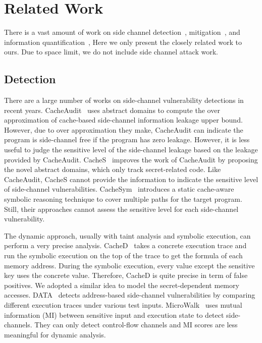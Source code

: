 \section{Related Work}

There is a vast amount of work on 
side channel 
detection~\cite{182946, 236338, Brotzman19Casym, 203878,217537,Wichelmann:2018:MFF:3274694.3274741,langley2010ctgrind}, 
mitigation~\cite{Page2005PartitionedCA,
Wang:2007:NCD:1250662.1250723,Zhang:2015:HDL:2775054.2694372,Li:2014:SLH:2541940.2541947,
236344,shih2017t,Coppens:2009:PMT:1607723.1608124,
brickell2006software,crane2015thwarting}, 
and information
quantification~\cite{10.1007/978-3-642-31424-7_40,McCamantE2008,5207642,Phan:2012:SQI:2382756.2382791,Chattopadhyay:2017:QIL:3127041.3127044}, 
Here we only present the closely related work to ours.
Due to space limit, we do not include side channel attack work.

\subsection{Detection}

There are a large number of works on side-channel vulnerability detections in
recent years.  CacheAudit~\cite{182946} uses abstract domains to compute the
over approximation of cache-based side-channel information leakage upper bound.
However, due to over approximation they make, CacheAudit can indicate the
program is side-channel free if the program has zero leakage.  However, it is
less useful to judge the sensitive level of the side-channel leakage based on
the leakage provided by CacheAudit. CacheS~\cite{236338} improves the work of
CacheAudit by proposing the novel abstract domains, which only track
secret-related code. Like CacheAudit, CacheS cannot provide the information to
indicate the sensitive level of side-channel vulnerabilities.
CacheSym~\cite{Brotzman19Casym} introduces a static cache-aware symbolic
reasoning technique to cover multiple paths for the target program. Still, their
approaches cannot assess the sensitive level for each side-channel
vulnerability.

The dynamic approach, usually with taint analysis and symbolic execution,
can perform a very precise analysis. CacheD~\cite{203878} takes a concrete
 execution trace and run the symbolic execution on the top of the trace
to get the formula of each memory address. During the symbolic execution, every
value except the sensitive key uses the concrete value. Therefore, CacheD is
quite precise in term of false positives. We adopted a similar idea to model the
secret-dependent memory accesses. DATA~\cite{217537} detects address-based
side-channel vulnerabilities by comparing different execution traces under
various test inputs. MicroWalk~\cite{Wichelmann:2018:MFF:3274694.3274741} uses
mutual information (MI) between sensitive input and execution state to detect
side-channels. They can only detect control-flow channels and MI scores are less
meaningful for dynamic analysis.

